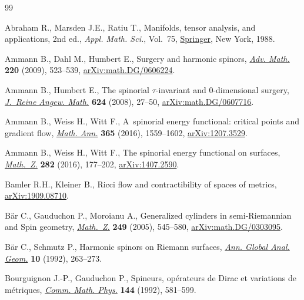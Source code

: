 \documentclass[pdftex]{sigma}
\newcommand\<{\langle}
\renewcommand\>{\rangle}
\theoremstyle{definition}
\newcommand\={\,=\,}
\numberwithin{equation}{section}
\begin{document}
\begin{thebibliography}{99}
\footnotesize\itemsep=0pt

Abraham R., Marsden J.E., Ratiu T., Manifolds, tensor analysis, and
 applications, 2nd ed., \textit{Appl. Math. Sci.}, Vol.~75,
 \href{https://doi.org/10.1007/978-1-4612-1029-0}{Springer}, New York, 1988.

Ammann B., Dahl M., Humbert E., Surgery and harmonic spinors,
 \href{https://doi.org/10.1016/j.aim.2008.09.013}{\textit{Adv. Math.}}
 \textbf{220} (2009), 523--539,
 \href{http://arxiv.org/abs/math.DG/0606224}{arXiv:math.DG/0606224}.

Ammann B., Humbert E., The spinorial {$\tau$}-invariant and 0-dimensional
 surgery, \href{https://doi.org/10.1515/CRELLE.2008.079}{\textit{J.~Reine
 Angew. Math.}} \textbf{624} (2008), 27--50,
 \href{http://arxiv.org/abs/math.DG/0607716}{arXiv:math.DG/0607716}.

Ammann B., Weiss H., Witt F., A~spinorial energy functional: critical points
 and gradient flow,
 \href{https://doi.org/10.1007/s00208-015-1315-8}{\textit{Math. Ann.}}
 \textbf{365} (2016), 1559--1602,
 \href{http://arxiv.org/abs/1207.3529}{arXiv:1207.3529}.

Ammann B., Weiss H., Witt F., The spinorial energy functional on surfaces,
 \href{https://doi.org/10.1007/s00209-015-1537-1}{\textit{Math.~Z.}}
 \textbf{282} (2016), 177--202,
 \href{http://arxiv.org/abs/1407.2590}{arXiv:1407.2590}.

Bamler R.H., Kleiner B., {R}icci flow and contractibility of spaces of metrics,
 \href{http://arxiv.org/abs/1909.08710}{arXiv:1909.08710}.

B\"ar C., Gauduchon P., Moroianu A., Generalized cylinders in semi-{R}iemannian
 and {S}pin geometry,
 \href{https://doi.org/10.1007/s00209-004-0718-0}{\textit{Math.~Z.}}
 \textbf{249} (2005), 545--580,
 \href{http://arxiv.org/abs/math.DG/0303095}{arXiv:math.DG/0303095}.

B\"ar C., Schmutz P., Harmonic spinors on {R}iemann surfaces,
 \href{https://doi.org/10.1007/BF00136869}{\textit{Ann. Global Anal. Geom.}}
 \textbf{10} (1992), 263--273.

Bourguignon J.-P., Gauduchon P., Spineurs, op\'erateurs de {D}irac et variations
 de m\'etriques, \href{https://doi.org/10.1007/BF02099184}{\textit{Comm. Math.
 Phys.}} \textbf{144} (1992), 581--599.


\end{thebibliography}
\end{document}
